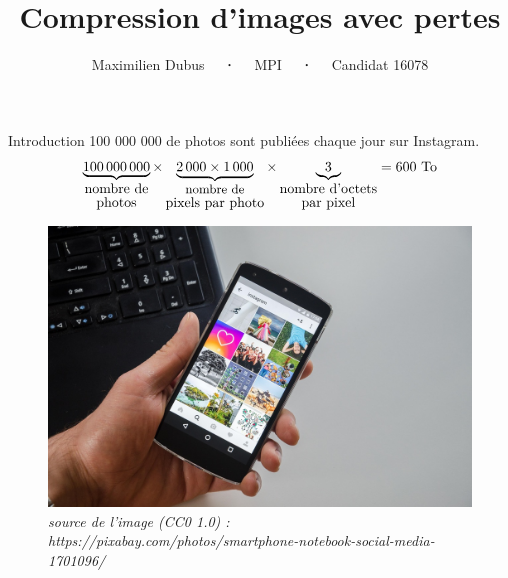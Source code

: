 \documentclass[xcolor=dvipsnames]{beamer}
\title{Compression d'images avec pertes}
\subtitle{Maximilien Dubus \ \ \textbf{·} \ \ MPI \ \ \textbf{·} \ \ Candidat 16078}
\date{ } %
\begin{document}
\begin{frame}
    
    \vspace{-100pt}
    \titlepage
\end{frame}

\begin{frame}{Introduction}
    \centering
    100 000 000 de photos sont publiées chaque jour sur Instagram. \\
    \footnotesize
    \[
        \underbrace{100\,000\,000}_{\shortstack{\text{nombre de}\\\text{photos}}}
        \times
        \underbrace{2\,000 \times 1\,000}_{\shortstack{\text{\small nombre de}\\\text{pixels par photo}}}
        \times
        \underbrace{3}_{\shortstack{\text{nombre d'octets}\\\text{par pixel}}}
        =  600\ \text{To}
    \]
    \begin{figure}
        \centering
        \includegraphics[width=0.55\linewidth]{instagram.jpg}
        \textit{\tiny \\ source de l'image (CC0 1.0) : https://pixabay.com/photos/smartphone-notebook-social-media-1701096/}
    \end{figure}
\end{frame}
\end{document}
